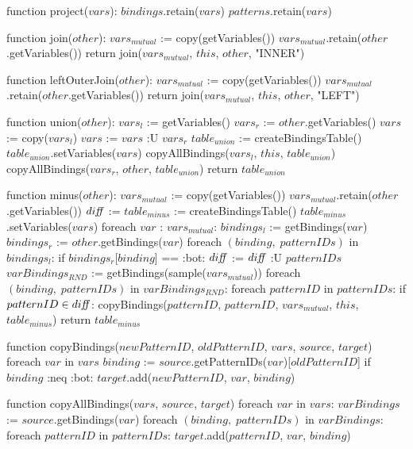 function project($vars$):
    $bindings$.retain($vars$)
    $patterns$.retain($vars$)

function join($other$):
    $vars_{mutual}$ := copy(getVariables())
    $vars_{mutual}$.retain($other$.getVariables())
    return join($vars_{mutual}$, $this$, $other$, "INNER")

function leftOuterJoin($other$): 
    $vars_{mutual}$ := copy(getVariables())
    $vars_{mutual}$.retain($other$.getVariables())
    return join($vars_{mutual}$, $this$, $other$, "LEFT")

function union($other$):
    $vars_l$ := getVariables()
    $vars_r$ := $other$.getVariables()
    $vars$ := copy($vars_l$)
    $vars$ := $vars$ :U $vars_r$ 
    $table_{union}$ := createBindingsTable()
    $table_{union}$.setVariables($vars$)
    copyAllBindings($vars_l$, $this$, $table_{union}$)
    copyAllBindings($vars_r$, $other$, $table_{union}$)
    return $table_{union}$

function minus($other$):
    $vars_{mutual}$ := copy(getVariables())
    $vars_{mutual}$.retain($other$.getVariables())
    $di\textrm{\emph{ff}}$ := {}
    $table_{minus}$ := createBindingsTable()
    $table_{minus}$.setVariables($vars$)
    foreach $var$ : $vars_{mutual}$:
        $bindings_l$ := getBindings($var$)
        $bindings_r$ := $other$.getBindings($var$)
        foreach $(binding, \; patternIDs)$ in $bindings_l$:
            if $bindings_r$[$binding$] == :bot:
                $di\textrm{\emph{ff}}$ := $di\textrm{\emph{ff}}$ :U $patternIDs$
    $varBindings_{RND}$ := getBindings(sample($vars_{mutual}$))
    foreach $(binding, \; patternIDs)$ in $varBindings_{RND}$:
        foreach $patternID$ in $patternIDs$:
            if $patternID \in di\textrm{\emph{ff}}$:
                copyBindings($patternID$, $patternID$, $vars_{mutual}$, $this$, $table_{minus}$)
    return $table_{minus}$
    
function copyBindings($newPatternID$, $oldPatternID$, $vars$, $source$, $target$) 
    foreach $var$ in $vars$
        $binding$ := $source$.getPatternIDs($var$)[$oldPatternID$]
        if $binding$ :neq :bot:
            $target$.add($newPatternID$, $var$, $binding$)
    
function copyAllBindings($vars$, $source$, $target$) 
    foreach $var$ in $vars$:
        $varBindings$ := $source$.getBindings($var$)
        foreach $(binding, \; patternIDs)$ in $varBindings$:
            foreach $patternID$ in $patternIDs$:
                $target$.add($patternID$, $var$, $binding$)

